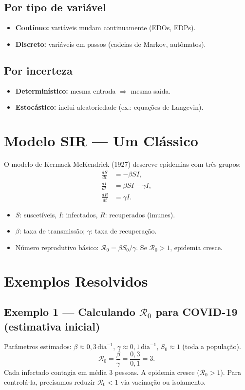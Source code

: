 \documentclass[12pt,a4paper]{article}
\begin{document}
\subsection*{Por tipo de vari\'avel}
\begin{itemize}
  \item \textbf{Cont\'inuo:} vari\'aveis mudam continuamente (EDOs, EDPs).
  \item \textbf{Discreto:} vari\'aveis em passos (cadeias de Markov, autômatos).
\end{itemize}
\subsection*{Por incerteza}
\begin{itemize}
  \item \textbf{Determin\'istico:} mesma entrada $\Rightarrow$ mesma sa\'ida.
  \item \textbf{Estoc\'astico:} inclui aleatoriedade (ex.: equa\c{c}\~oes de Langevin).
\end{itemize}

\section*{Modelo SIR --- Um Cl\'assico}
O modelo de Kermack-McKendrick (1927) descreve epidemias com tr\^es grupos:
\begin{align*}
\frac{dS}{dt} &= -\beta SI, \\
\frac{dI}{dt} &= \beta SI - \gamma I, \\
\frac{dR}{dt} &= \gamma I.
\end{align*}
\begin{itemize}
  \item $S$: suscet\'iveis, $I$: infectados, $R$: recuperados (imunes).
  \item $\beta$: taxa de transmiss\~ao; $\gamma$: taxa de recupera\c{c}\~ao.
  \item N\'umero reprodutivo b\'asico: $\mathcal{R}_0 = \beta S_0 / \gamma$. Se $\mathcal{R}_0>1$, epidemia cresce.
\end{itemize}

\section*{Exemplos Resolvidos}

\subsection*{Exemplo 1 --- Calculando $\mathcal{R}_0$ para COVID-19 (estimativa inicial)}
Par\^ametros estimados: $\beta \approx 0{,}3\,\text{dia}^{-1}$, $\gamma \approx 0{,}1\,\text{dia}^{-1}$, $S_0 \approx 1$ (toda a popula\c{c}\~ao).
\[
\mathcal{R}_0 = \frac{\beta}{\gamma} = \frac{0{,}3}{0{,}1} = 3.
\]
Cada infectado contagia em m\'edia 3 pessoas. A epidemia cresce ($\mathcal{R}_0 > 1$). Para control\'a-la, precisamos reduzir $\mathcal{R}_0 < 1$ via vacinação ou isolamento.
\end{document}

